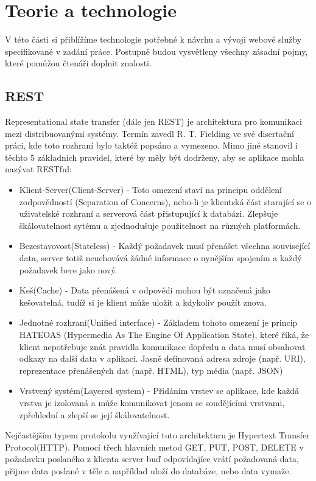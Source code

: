    
  \chapter{Teorie a technologie}
  V této části si přiblížíme technologie potřebné k návrhu a vývoji webové služby specifikované v zadání práce. Postupně budou vysvětleny všechny zásadní pojmy, které pomůžou čtenáři doplnit znalosti.
  
  \section{REST}
	Representational state transfer (dále jen REST) je architektura pro komunikaci  mezi distribuovanými systémy. Termín zavedl R. T. Fielding ve své disertační práci\cite{restThesis}, kde toto rozhraní bylo taktéž popsáno a vymezeno. Mimo jiné stanovil i těchto 5 základních pravidel, které by měly být dodrženy, aby se aplikace mohla nazývat RESTful\cite{rest}:
	\begin{itemize}
		\item Klient-Server(Client-Server) - Toto omezení staví na principu oddělení zodpovědností (Separation of Concerns), nebo-li je klientská část starající se o uživatelské rozhraní a serverová část přistupující k databázi. Zlepšuje škálovatelnost sytému a zjednodušuje použitelnost na různých platformách.
		\item Bezestavovost(Stateless) - Každý požadavek musí přenášet všechna související data, server totiž neuchovává žádné informace o nynějším spojením a každý požadavek bere jako nový.
		\item Keš(Cache) - Data přenášená v odpovědi mohou být označená jako kešovatelná, tudíž si je klient může uložit a kdykoliv použít znova.
		\item Jednotné rozhraní(Unified interface) - Základem tohoto omezení je princip HATEOAS (Hypermedia As The Engine Of Application State), které říká, že klient nepotřebuje znát pravidla komunikace dopředu a data musí obsahovat odkazy na další data v aplikaci. Jasně definovaná adresa zdroje (např. URI), reprezentace přenášených dat (např. HTML), typ média (např. JSON)
		\item Vrstvený systém(Layered system) - Přidáním vrstev se aplikace, kde každá vrstva je izolovaná a může komunikovat jenom se soudějícími vrstvami, zpřehlední a zlepší se její škálovatelnost.
	\end{itemize}	
	Nejčastějším typem protokolu využívající tuto architekturu je Hypertext Transfer Protocol(HTTP). Pomocí třech hlavních metod GET, PUT, POST, DELETE v požadavku poslaného z klienta server buď odpovídajíce vrátí požadovaná data, přijme data poslané v těle a například uloží do databáze, nebo data vymaže. 

